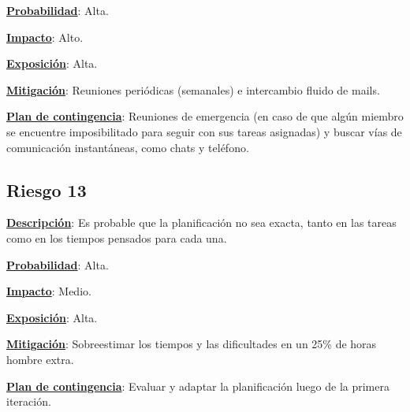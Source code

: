 \textbf{\underline{Probabilidad}}: Alta.

\textbf{\underline{Impacto}}: Alto.

\textbf{\underline{Exposición}}: Alta.

\textbf{\underline{Mitigación}}: Reuniones periódicas (semanales) e intercambio fluido de mails.

\textbf{\underline{Plan de contingencia}}: Reuniones de emergencia (en caso de que algún miembro se encuentre imposibilitado para seguir con sus tareas asignadas) y buscar vías de comunicación instantáneas, como chats y teléfono.

\subsection*{Riesgo 13}
\textbf{\underline{Descripción}}: Es probable que la planificación no sea exacta, tanto en las tareas como en los tiempos pensados para cada una.

\textbf{\underline{Probabilidad}}: Alta.

\textbf{\underline{Impacto}}: Medio.

\textbf{\underline{Exposición}}: Alta.

\textbf{\underline{Mitigación}}: Sobreestimar los tiempos y las dificultades en un 25\% de horas hombre extra.

\textbf{\underline{Plan de contingencia}}: Evaluar y adaptar la planificación luego de la primera iteración.

